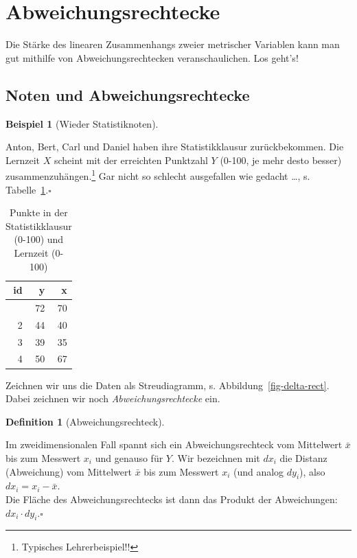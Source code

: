 \documentclass[
  a4paper,
]{scrbook}
\theoremstyle{definition}
\newtheorem{example}{Beispiel}[chapter]
\theoremstyle{definition}
\newtheorem{definition}{Definition}[chapter]
\theoremstyle{definition}
\theoremstyle{remark}
\begin{document}
\section{Abweichungsrechtecke}\label{sec-cov}

Die Stärke des linearen Zusammenhangs zweier metrischer Variablen kann
man gut mithilfe von Abweichungsrechtecken veranschaulichen. Los geht's!

\subsection{Noten und
Abweichungsrechtecke}\label{noten-und-abweichungsrechtecke}

\begin{example}[Wieder
Statistiknoten]\protect\hypertarget{exm-noten2}{}\label{exm-noten2}

Anton, Bert, Carl und Daniel haben ihre Statistikklausur zurückbekommen.
Die Lernzeit \(X\) scheint mit der erreichten Punktzahl \(Y\) (0-100, je
mehr desto besser) zusammenzuhängen.\footnote{ Typisches
  Lehrerbeispiel!!} Gar nicht so schlecht ausgefallen wie gedacht
\ldots, s. Tabelle~\ref{tbl-noten2}.\(\square\)

\end{example}

\begin{longtable}[]{@{}rrr@{}}

\caption{\label{tbl-noten2}Punkte in der Statistikklausur (0-100) und
Lernzeit (0-100)}

\tabularnewline

\toprule\noalign{}
id & y & x \\
\midrule\noalign{}
\endhead
\bottomrule\noalign{}
\endlastfoot
1 & 72 & 70 \\
2 & 44 & 40 \\
3 & 39 & 35 \\
4 & 50 & 67 \\

\end{longtable}

Zeichnen wir uns die Daten als Streudiagramm, s.
Abbildung~\ref{fig-delta-rect}. Dabei zeichnen wir noch
\emph{Abweichungsrechtecke} ein.

\begin{definition}[Abweichungsrechteck]\protect\hypertarget{def-abweichungsrechteck}{}\label{def-abweichungsrechteck}

Im zweidimensionalen Fall spannt sich ein Abweichungsrechteck vom
Mittelwert \(\bar{x}\) bis zum Messwert \(x_i\) und genauso für \(Y\).
Wir bezeichnen mit \(dx_i\) die Distanz (Abweichung) vom Mittelwert
\(\bar{x}\) bis zum Messwert \(x_i\) (und analog \(dy_i\)), also
\(dx_i = x_i - \bar{x}\).\\
Die Fläche des Abweichungsrechtecks ist dann das Produkt der
Abweichungen: \(dx_i \cdot dy_i\).\(\square\)

\end{definition}
\end{document}
